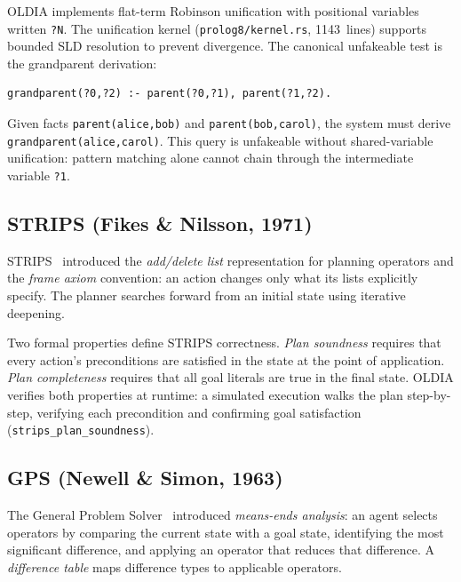 OLDIA implements flat-term Robinson unification with positional variables
written \texttt{?N}.  The unification kernel (\texttt{prolog8/kernel.rs},
1143~lines) supports bounded SLD resolution to prevent divergence.  The
canonical unfakeable test is the grandparent derivation:
\begin{verbatim}
grandparent(?0,?2) :- parent(?0,?1), parent(?1,?2).
\end{verbatim}
Given facts \texttt{parent(alice,bob)} and \texttt{parent(bob,carol)}, the
system must derive \texttt{grandparent(alice,carol)}.  This query is
unfakeable without shared-variable unification: pattern matching alone cannot
chain through the intermediate variable \texttt{?1}.

\subsection{STRIPS (Fikes \& Nilsson, 1971)}
\label{subsec:strips}

STRIPS~\cite{fikes1971} introduced the \emph{add/delete list} representation
for planning operators and the \emph{frame axiom} convention: an action
changes only what its lists explicitly specify.  The planner searches forward
from an initial state using iterative deepening.

Two formal properties define STRIPS correctness.  \emph{Plan soundness}
requires that every action's preconditions are satisfied in the state at the
point of application.  \emph{Plan completeness} requires that all goal
literals are true in the final state.  OLDIA verifies both properties at
runtime: a simulated execution walks the plan step-by-step, verifying each
precondition and confirming goal satisfaction
(\texttt{strips\_plan\_soundness}).

\subsection{GPS (Newell \& Simon, 1963)}
\label{subsec:gps}

The General Problem Solver~\cite{newell1963} introduced \emph{means-ends
analysis}: an agent selects operators by comparing the current state with a
goal state, identifying the most significant difference, and applying an
operator that reduces that difference.  A \emph{difference table} maps
difference types to applicable operators.

